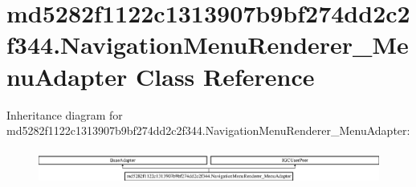 \hypertarget{classmd5282f1122c1313907b9bf274dd2c2f344_1_1NavigationMenuRenderer__MenuAdapter}{}\section{md5282f1122c1313907b9bf274dd2c2f344.\+Navigation\+Menu\+Renderer\+\_\+\+Menu\+Adapter Class Reference}
\label{classmd5282f1122c1313907b9bf274dd2c2f344_1_1NavigationMenuRenderer__MenuAdapter}
Inheritance diagram for md5282f1122c1313907b9bf274dd2c2f344.\+Navigation\+Menu\+Renderer\+\_\+\+Menu\+Adapter\+:\begin{figure}[H]
\begin{center}
\leavevmode
\includegraphics[height=1.140530cm]{classmd5282f1122c1313907b9bf274dd2c2f344_1_1NavigationMenuRenderer__MenuAdapter}
\end{center}
\end{figure}
